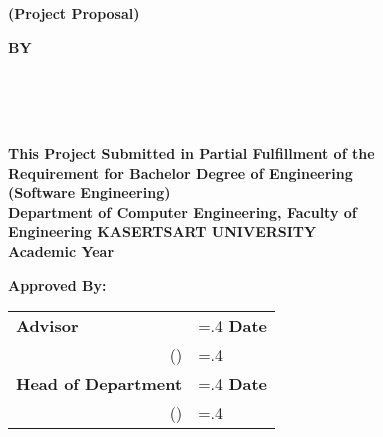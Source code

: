 \thispagestyle{empty}
\begin{center}
    {\huge\textbf{\usevar{\srsTitle}}} %
    {\huge\textbf{(Project Proposal)}}\vspace{1in}

    {\huge\textbf{BY}}\vspace{.5in}

    {\huge\textbf{%
        \usevar{\srsAuthorOne} \\
        \usevar{\srsAuthorTwo} \\
        \usevar{\srsAuthorThree} \\
    }}\vfill

    {\large\textbf{%
        This Project Submitted in Partial Fulfillment of the\\
        Requirement for Bachelor Degree of Engineering\\
        (Software Engineering)\\
        Department of Computer Engineering, Faculty of\\
        Engineering KASERTSART UNIVERSITY\\
        Academic Year \usevar{\srsAcademicYear}\\
    }}
\end{center}

\vspace{.5in}

{\large\textbf{Approved By:}}\vspace{.2in}

\begin{tabularx}{1\textwidth}{X >{\hsize=.4\hsize}X}
    \textbf{Advisor}\dotfill & \textbf{Date}\dotfill \\
    \multicolumn{1}{r}{(\usevar{\srsAdvisorName})} & \\[.1in]

    
    \textbf{Head of Department}\dotfill & \textbf{Date}\dotfill \\
    \multicolumn{1}{r}{(\usevar{\srsHoDName})} & \\
\end{tabularx}

\restoregeometry